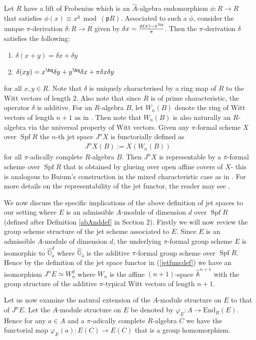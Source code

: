 \documentclass{amsart}
\def \d{\delta}
\numberwithin {equation}{section}
\newcommand{\map}{\rightarrow}
\newcommand{\mfrak}[1]{\mathfrak{#1}}
\def \vp{\varphi}
\def \d{\delta} \def \bZ{{\mathbb Z}} \def \bV{{\mathcal V}} \def \bF{{\bf F}}
\def \bA{{\mathbb A}} \def \bZg{\bZ_{\geq 0}} \def \bB{{\bf B}}
\def \hG{\hat{\mathbb{G}}_{\mathrm{a}}}
\DeclareMathOperator{\Spf}{\mathrm{Spf}}
\begin{document}
\color{black}


Let $R$ have a lift of Frobenius which is an $\hat{A}$-algebra
endomorphism $\phi:R\map R$ that satisfies $\phi(x) \equiv x^{\hat{q}}
\bmod (\mfrak{p}R)$. 
Associated to such a $\phi$, consider the unique $\pi$-derivation $\d:R \map
R$ given by $\d x = \frac{\phi(x)- x^{\hq}}{\pi}$. Then the $\pi$-derivation
$\d$ satisfies the following:
\begin{enumerate}
\item $\d(x+y) = \d x + \d y$
\item $\d(xy) = x^{\hq}\d y + y^{\hq} \d x+ \pi \d x \d y$
\end{enumerate}
for all $x,y \in R$.
Note that $\d$ is uniquely characterised by a ring map of $R$ to the Witt 
vectors of length $2$. Also note that since $R$ is of prime characteristic, 
the operator $\d$ is additive.
For an $R$-algebra $B$, let $W_n(B)$ denote the ring of Witt vectors of
length $n+1$ as in \cite{bor11b}. Then note that $W_n(B)$ is also naturally 
an $R$-algebra via the universal property of Witt vectors.
Given 
any $\pi$-formal scheme $X$ over $\Spf R$ the $n$-th jet space $J^nX$ is 
functorially defined as 
\begin{align}
\label{jetfuncdef}
J^nX(B) := X(W_n(B))
\end{align}
for all $\pi$-adically complete $R$-algebra $B$. Then $J^nX$ is representable 
by a $\pi$-formal scheme over $\Spf R$ that is obtained by glueing over open
affine covers of $X$- this is analogous to Buium's construction in the 
mixed characteristic case as in \cite{Buium 1995}.
For more details on the representability of the jet functor, the reader may
see \cite{bps} \cite{bor11b}. 

\cblue
We now discuss the specific implications of the above definition of jet 
spaces to our setting
where $E$ is an admissible $A$-module of dimension $d$ over $\Spf R$
(defined after Definition \ref{abAnddef} in Section $2$). 
Firstly we will now review the group scheme structure of the jet scheme 
associated to $E$.
Since $E$ is an admissible $A$-module of dimension $d$, the underlying 
$\pi$-formal group scheme $E$ is isomorphic to $\hG^d$ where $\hG$ is 
the additive $\pi$-formal group scheme over $\Spf R$. Hence by the definition
of the jet space functor in (\ref{jetfuncdef}) we have an isomorphism 
$J^nE \simeq W_n^d$ 
where $W_n$ is the affine $(n+1)$-space $\hat{\bA}^{n+1}$ with the 
group structure of the additive $\pi$-typical Witt vectors of length $n+1$.

Let us now examine the natural extension of the $A$-module structure on $E$
to that of $J^nE$. Let the $A$-module
structure on $E$ be denoted by $\vp_E:A \map \mathrm{End}_R(E)$. Hence for any
$a \in A$ and a $\pi$-adically complete $R$-algebra $C$ we have the functorial
map $\vp_E(a): E(C) \map E(C)$ that is a group homomorphism.
\end{document}
